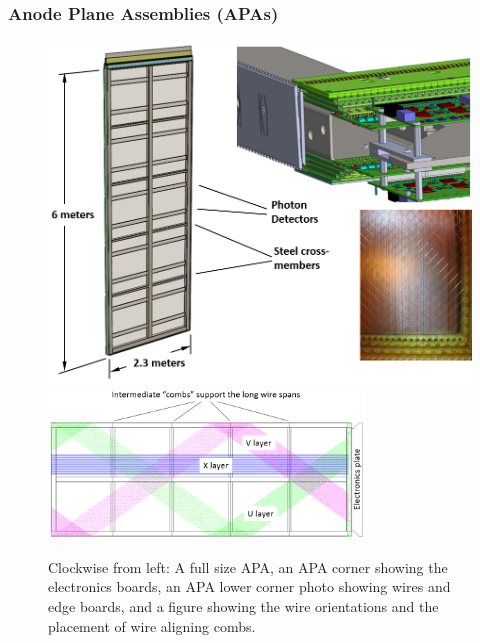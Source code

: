
\subsubsection{Anode Plane Assemblies (APAs)}




\begin{figure}[!htb]
\centering
\begin{minipage}[b]{1.0\textwidth}
\begin{center}
\includegraphics[width=.75\textwidth]{figures/TPC_APA_1}
\includegraphics[width=0.75\textwidth]{figures/TPC_APA_2}
\end{center}
\end{minipage}
\caption{Clockwise from left: A full size APA, an APA corner showing the electronics boards, an APA lower corner photo showing wires and edge boards, and a figure showing the wire orientations and the placement of wire aligning combs. }
\label{fig:tpc_apa_overview} 
\end{figure}


